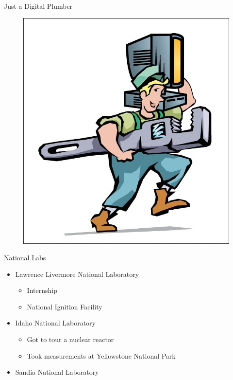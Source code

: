 \documentclass{beamer}
\begin{document}
\begin{frame}{Just a Digital Plumber}
\begin{figure}
	\includegraphics[width=.65\linewidth]{img/digitalplumber.jpg}
\end{figure}
\end{frame}

\begin{frame}{National Labs}
\begin{itemize}
	\item Lawrence Livermore National Laboratory
	\begin{itemize}
		\item Internship
		\item National Ignition Facility
	\end{itemize}
	\item Idaho National Laboratory
	\begin{itemize}
		\item Got to tour a nuclear reactor
		\item Took measurements at Yellowstone National Park
	\end{itemize}
	\item Sandia National Laboratory
\end{itemize}
\end{frame}
\end{document}
